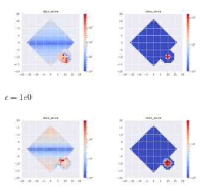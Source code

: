 \documentclass[runningheads]{llncs}
\begin{document}
\begin{figure}[H]
\ContinuedFloat
    \centering
    \begin{subfigure}[b]{\textwidth}
        \centering
        \includegraphics[width=0.49\textwidth]{img/epsilon/1e0/updates_state_aware.pdf}
        \includegraphics[width=0.49\textwidth]{img/epsilon/1e0/occupations_state_aware.pdf}
        \caption{$\epsilon=1e0$}
    \end{subfigure}
    \begin{subfigure}[b]{\textwidth}
        \centering
        \includegraphics[width=0.49\textwidth]{img/epsilon/1e1/updates_state_aware.pdf}
        \includegraphics[width=0.49\textwidth]{img/epsilon/1e1/occupations_state_aware.pdf}

\end{subfigure}
\end{figure}
\end{document}
